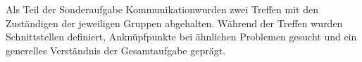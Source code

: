 Als Teil der Sonderaufgabe \glqq Kommunikation\grqq wurden zwei Treffen mit den Zuständigen der jeweiligen Gruppen abgehalten. Während der Treffen wurden Schnittstellen definiert, Anknüpfpunkte bei ähnlichen Problemen gesucht und ein generelles Verständnis der Gesamtaufgabe geprägt.
